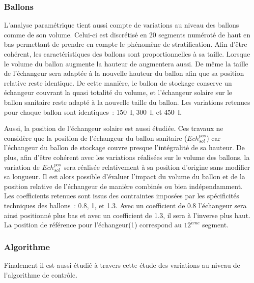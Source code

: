 \subsubsection{Ballons} %
\label{ssub:ballons}
L’analyse paramétrique tient aussi compte de variations au niveau des ballons comme
de son volume. Celui-ci est discrétisé en \num{20} segments numéroté de haut en bas
permettant de prendre en compte le phénomène de stratification.
Afin d’être cohérent, les caractéristiques des ballons sont proportionnelles à sa taille.
Lorsque le volume du ballon augmente la hauteur de augmentera aussi.
De même la taille de l’échangeur sera adaptée à la nouvelle hauteur du ballon
afin que sa position relative reste identique. De cette manière, le ballon de
stockage conserve un échangeur couvrant la quasi totalité du volume, et
l’échangeur solaire sur le ballon sanitaire reste adapté à la nouvelle taille du
ballon. Les variations retenues pour chaque ballon sont identiques~:
\SI{150}{l}, \SI{300}{l}, et \SI{450}{l}.

Aussi, la position de l’échangeur solaire est aussi étudiée. Ces travaux ne considère que
la position de l’échangeur du ballon sanitaire ($Ech_{sol}^{pos}$) car l’échangeur du
ballon de stockage couvre presque l’intégralité de sa hauteur. De plus, afin d’être
cohérent avec les variations réalisées sur le volume des ballons, la variation de
$Ech_{sol}^{pos}$ sera réalisée relativement à sa position d’origine sans modifier sa
longueur. Il est alors possible d’évaluer l’impact du volume du ballon et de la position
relative de l’échangeur de manière combinés ou bien indépendamment. Les coefficients
retenues sont issus des contraintes imposées par les spécificités techniques des ballons~:
\num{0.8}, \num{1}, et \num{1.3}. Avec un coefficient de \num{0.8} l’échangeur sera ainsi
positionné plus bas et avec un coefficient de \num{1.3}, il sera à l’inverse plus haut. La
position de référence pour l’échangeur(\num{1}) correspond au $12^{\grave eme}$ segment.


\subsubsection{Algorithme} %
\label{ssub:variations_algorithmiques}
Finalement il est aussi étudié à travers cette étude des variations au niveau
de l’algorithme de contrôle.

